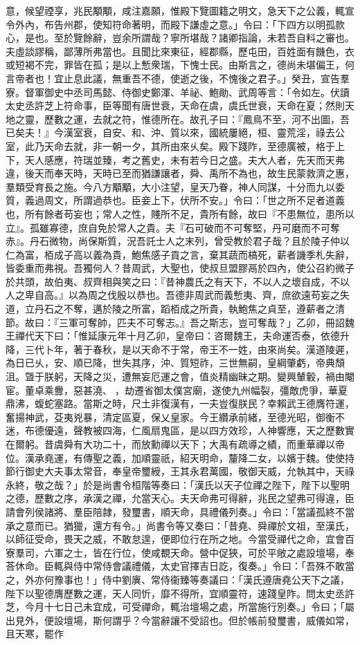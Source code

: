 \begin{pinyinscope}
意，候望禋享，兆民顒顒，咸注嘉願，惟殿下覽圖籍之明文，急天下之公義，輒宣令外內，布告州郡，使知符命著明，而殿下謙虛之意。」令曰：「下四方以明孤款心，是也。至於覽餘辭，豈余所謂哉？寧所堪哉？諸卿指論，未若吾自料之審也。夫虛談謬稱，鄙薄所弗當也。且聞比來東征，經郡縣，歷屯田，百姓面有饑色，衣或短褐不完，罪皆在孤；是以上慙衆瑞，下愧士民。由斯言之，德尚未堪偏王，何言帝者也！宜止息此議，無重吾不德，使逝之後，不愧後之君子。」癸丑，宣告羣寮。督軍御史中丞司馬懿、侍御史鄭渾、羊祕、鮑勛、武周等言：「令如左。伏讀太史丞許芝上符命事，臣等聞有唐世衰，天命在虞，虞氏世衰，天命在夏；然則天地之靈，歷數之運，去就之符，惟德所在。故孔子曰：『鳳鳥不至，河不出圖，吾已矣夫！』今漢室衰，自安、和、沖、質以來，國統屢絕，桓、靈荒淫，祿去公室，此乃天命去就，非一朝一夕，其所由來乆矣。殿下踐阼，至德廣被，格于上下，天人感應，符瑞並臻，考之舊史，未有若今日之盛。夫大人者，先天而天弗違，後天而奉天時，天時已至而猶謙讓者，舜、禹所不為也，故生民蒙救濟之惠，羣類受育長之施。今八方顒顒，大小注望，皇天乃眷，神人同謀，十分而九以委質，義過周文，所謂過恭也。臣妾上下，伏所不安。」令曰：「世之所不足者道義也，所有餘者苟妄也；常人之性，賤所不足，貴所有餘，故曰『不患無位，患所以立』。孤雖寡德，庶自免於常人之貴。夫『石可破而不可奪堅，丹可磨而不可奪赤』。丹石微物，尚保斯質，況吾託士人之末列，曾受教於君子哉？且於陵子仲以仁為富，栢成子高以義為貴，鮑焦感子貢之言，棄其蔬而槁死，薪者譏季札失辭，皆委重而弗視。吾獨何人？昔周武，大聖也，使叔旦盟膠鬲於四內，使公召約微子於共頭，故伯夷、叔齊相與笑之曰：『昔神農氏之有天下，不以人之壞自成，不以人之卑自高。』以為周之伐殷以恭也。吾德非周武而義慙夷、齊，庶欲遠苟妄之失道，立丹石之不奪，邁於陵之所富，蹈栢成之所貴，執鮑焦之貞至，遵薪者之清節。故曰：『三軍可奪帥，匹夫不可奪志。』吾之斯志，豈可奪哉？」乙卯，冊詔魏王禪代天下曰：「惟延康元年十月乙卯，皇帝曰：咨爾魏王，夫命運否泰，依德升降，三代卜年，著于春秋，是以天命不于常，帝王不一姓，由來尚矣。漢道陵遲，為日已乆，安、順已降，世失其序，沖、質短祚，三世無嗣，皇綱肇虧，帝典頹沮。曁于朕躬，天降之災，遭無妄厄運之會，值炎精幽昧之期。變興輦轂，禍由閹宦。董卓乘釁，惡甚澆、𤡬，劫遷省御太僕宮廟，遂使九州幅裂，彊敵虎爭，華夏鼎沸，蝮蛇塞路。當斯之時，尺土非復漢有，一夫豈復朕民？幸賴武王德膺符運，奮揚神武，芟夷兇暴，清定區夏，保乂皇家。今王纘承前緒，至德光昭，御衡不迷，布德優遠，聲教被四海，仁風扇鬼區，是以四方效珍，人神響應，天之歷數實在爾躬。昔虞舜有大功二十，而放勳禪以天下；大禹有疏導之績，而重華禪以帝位。漢承堯運，有傳聖之義，加順靈祇，紹天明命，釐降二女，以嬪于魏。使使持節行御史大夫事太常音，奉皇帝璽綬，王其永君萬國，敬御天威，允執其中，天祿永終，敬之哉？」於是尚書令桓階等奏曰：「漢氏以天子位禪之陛下，陛下以聖明之德，歷數之序，承漢之禪，允當天心。夫天命弗可得辭，兆民之望弗可得違，臣請會列侯諸將、羣臣陪隷，發璽書，順天命，具禮儀列奏。」令曰：「當議孤終不當承之意而已。猶獵，還方有令。」尚書令等又奏曰：「昔堯、舜禪於文祖，至漢氏，以師征受命，畏天之威，不敢怠遑，便即位行在所之地。今當受禪代之命，宜會百寮羣司，六軍之士，皆在行位，使咸覩天命。營中促狹，可於平敞之處設壇場，奉荅休命。臣輒與侍中常侍會議禮儀，太史官擇吉日訖，復奏。」令曰：「吾殊不敢當之，外亦何豫事也！」侍中劉廙、常侍衞臻等奏議曰：「漢氏遵唐堯公天下之議，陛下以聖德膺歷數之運，天人同忻，靡不得所，宜順靈符，速踐皇阼。問太史丞許芝，今月十七日己未宜成，可受禪命，輒治壇場之處，所當施行別奏。」令曰；「屬出見外，便設壇場，斯何謂乎？今當辭讓不受詔也。但於帳前發璽書，威儀如常，且天寒，罷作
\end{pinyinscope}
